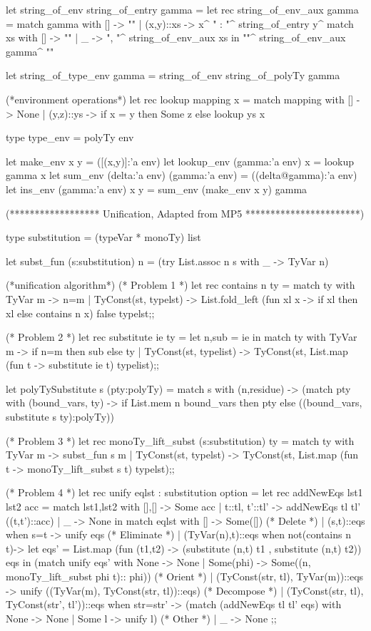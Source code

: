 let string_of_env string_of_entry gamma = 
  let rec string_of_env_aux gamma =
    match gamma with
       []        -> ""
     | (x,y)::xs -> x^ " : "^ string_of_entry y^
                    match xs with [] -> "" | _  -> ", "^
                                                   string_of_env_aux xs
  in
    "{"^ string_of_env_aux gamma^ "}"

let string_of_type_env gamma = string_of_env string_of_polyTy gamma

(*environment operations*)
let rec lookup mapping x =
  match mapping with
     []        -> None
   | (y,z)::ys -> if x = y then Some z else lookup ys x

type type_env = polyTy env

let make_env x y = ([(x,y)]:'a env)
let lookup_env (gamma:'a env) x = lookup gamma x
let sum_env (delta:'a env) (gamma:'a env) = ((delta@gamma):'a env)
let ins_env (gamma:'a env) x y = sum_env (make_env x y) gamma

(****************** Unification, Adapted from MP5 ***********************)

type substitution = (typeVar * monoTy) list

let subst_fun (s:substitution) n = (try List.assoc n s with _ -> TyVar n)

(*unification algorithm*)
(* Problem 1 *)
let rec contains n ty =
  match ty with
    TyVar m -> n=m
  | TyConst(st, typelst) ->
     List.fold_left (fun xl x -> if xl then xl else contains n x) false typelst;;

(* Problem 2 *)
let rec substitute ie ty = 
  let n,sub = ie 
  in match ty with
       TyVar m -> if n=m then sub else ty
     | TyConst(st, typelist) -> TyConst(st, List.map (fun t -> substitute ie t) typelist);;

let polyTySubstitute s (pty:polyTy) =
    match s with  (n,residue) ->
    (match pty with (bound_vars, ty) -> 
           if List.mem n bound_vars then pty
           else ((bound_vars, substitute s ty):polyTy))
    

(* Problem 3 *)
let rec monoTy_lift_subst (s:substitution) ty =
  match ty with
    TyVar m -> subst_fun s m
  | TyConst(st, typelst) ->  TyConst(st, List.map (fun t -> monoTy_lift_subst s t) typelst);;

(* Problem 4 *)
let rec unify eqlst : substitution option =
  let rec addNewEqs lst1 lst2 acc =
    match lst1,lst2 with
      [],[] -> Some acc
    | t::tl, t'::tl' -> addNewEqs tl tl' ((t,t')::acc)
    | _ -> None
  in
  match eqlst with
    [] -> Some([])
    (* Delete *)
  | (s,t)::eqs when s=t -> unify eqs
    (* Eliminate *)
  | (TyVar(n),t)::eqs when not(contains n t)-> 
      let eqs' = List.map (fun (t1,t2) -> (substitute (n,t) t1 , substitute (n,t) t2)) eqs
      in (match unify eqs' with
           None -> None
         | Some(phi) -> Some((n, monoTy_lift_subst phi t):: phi))
    (* Orient *)
  | (TyConst(str, tl), TyVar(m))::eqs -> unify ((TyVar(m), TyConst(str, tl))::eqs)
    (* Decompose *)
  | (TyConst(str, tl), TyConst(str', tl'))::eqs when str=str' -> 
      (match (addNewEqs tl tl' eqs) with
        None -> None
      | Some l -> unify l)
    (* Other *)
  | _ -> None
;;




